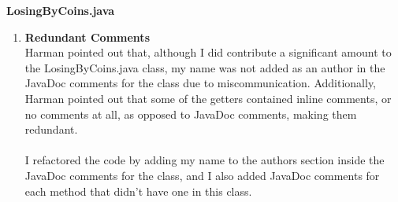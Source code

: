 \documentclass[12pt, letterpaper]{article}
\begin{document}
\textbf{LosingByCoins.java}
\begin{enumerate}
    \item \textbf{Redundant Comments} \\
    Harman pointed out that, although I did contribute a significant amount to the LosingByCoins.java class, my name was not added as an author in the JavaDoc comments for the class due to miscommunication. Additionally, Harman pointed out that some of the getters contained inline comments, or no comments at all, as opposed to JavaDoc comments, making them redundant.
    \\
    \\ 
    I refactored the code by adding my name to the authors section inside the JavaDoc comments for the class, and I also added JavaDoc comments for each method that didn't have one in this class.
    
\end{enumerate}

\end{document}
